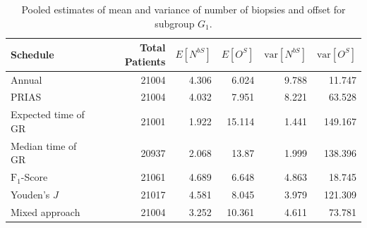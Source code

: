 \begin{table}[!htb]
\centering
\captionsetup{justification=centering}
\caption{Pooled estimates of mean and variance of number of biopsies and offset for subgroup $G_1$.}
\label{table : sim_study_pooled_estimates_G1}
\begin{tabular}{@{}lrrrrr@{}}
\toprule
Schedule           & Total Patients & $E[N^{bS}]$ & $E[O^{S}]$ & $\mbox{var}[N^{bS}]$ & $\mbox{var}[O^S]$ \\ \midrule
Annual              & 21004                  & 4.306           & 6.024               & 9.788          & 11.747             \\
PRIAS              & 21004                  & 4.032           & 7.951               & 8.221          & 63.528             \\
Expected time of GR & 21001                  & 1.922           & 15.114              & 1.441          & 149.167            \\
Median time of GR  & 20937                  & 2.068           & 13.87               & 1.999          & 138.396            \\
$\text{F}_1$-Score           & 21061                  & 4.689           & 6.648               & 4.863          & 18.745             \\
Youden's $J$             & 21017                  & 4.581           & 8.045               & 3.979          & 121.309            \\
Mixed approach     & 21004                  & 3.252           & 10.361              & 4.611          & 73.781             \\ \bottomrule
\end{tabular}
\end{table}

